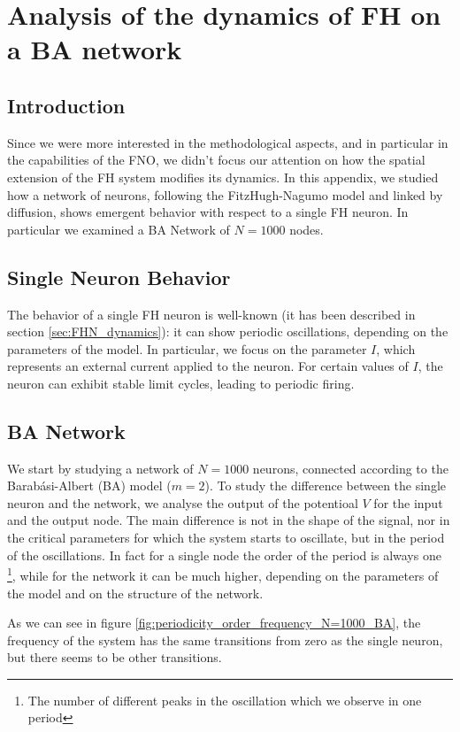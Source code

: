 \chapter{Analysis of the dynamics of FH on a BA network}


\section{Introduction}
Since we were more interested in the methodological aspects, and in particular in the capabilities of the FNO, we didn't focus our attention on how the spatial extension of the FH system modifies its dynamics.
In this appendix, we studied how a network of neurons, following the FitzHugh-Nagumo model and linked by diffusion, shows emergent behavior with respect to a single FH neuron. In particular we examined a BA Network of $N=1000$ nodes.

\section{Single Neuron Behavior}
The behavior of a single FH neuron is well-known (it has been described in section \ref{sec:FHN_dynamics}): it can show periodic oscillations, depending on the parameters of the model. 
In particular, we focus on the parameter $I$, which represents an external current applied to the neuron. For certain values of $I$, 
the neuron can exhibit stable limit cycles, leading to periodic firing.

\section{BA Network}
We start by studying a network of $N=1000$ neurons, connected according to the Barabási-Albert (BA) model ($m=2$).
To study the difference between the single neuron and the network, we analyse the output of the potentioal $V$ for the input and the output node.
The main difference is not in the shape of the signal, nor in the critical parameters for which the system starts to oscillate, but in the period of the oscillations.
In fact for a single node the order of the period is always one \footnote{The number of different peaks in the oscillation which we observe in one period}, while for the network
it can be much higher, depending on the parameters of the model and on the structure of the network.




As we can see in figure \ref{fig:periodicity_order_frequency_N=1000_BA}, the frequency of the system has the same transitions from zero as the single neuron, 
but there seems to be other transitions.

